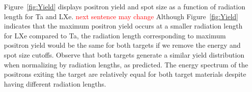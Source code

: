 \documentclass[
reprint,
nofootinbib,
amsmath, amssymb,
aps,
floatfix,
]{revtex4-2}
\begin{document}

Figure~\ref{fig:Yield} displays positron yield and spot size as a function of radiation length for Ta and LXe.
\textcolor{red}{next sentence may change}
Although Figure~\ref{fig:Yield} indicates that the maximum positron yield occurs at a smaller radiation length for LXe compared to Ta,
the radiation length corresponding to maximum positron yield would be the same for both targets if we remove the energy and spot size cutoffs.
Observe that both targets generate a similar yield distribution when normalizing by
radiation lengths, as predicted.
The energy spectrum of the positrons exiting the
target are relatively equal for both target materials despite having different radiation lengths.
\end{document}
